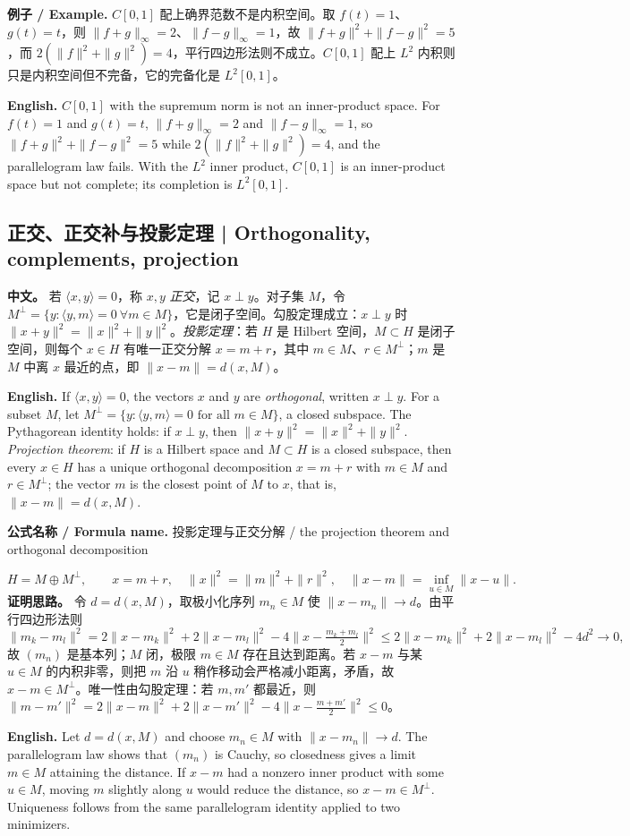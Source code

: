 \documentclass[UTF8,11pt,a4paper]{ctexart}
\newcommand{\EN}[1]{\par\noindent \textbf{English.} #1\par}
\newcommand{\FORMULA}[2]{\par\noindent\textbf{公式名称 / Formula name.} #1 / #2\par}
\newcommand{\EX}[2]{\par\noindent \textbf{例子 / Example.} #1\par\EN{#2}}
\newcommand{\APS}[2]{\par\noindent\textbf{中文。} #1\par\noindent\textbf{English.} #2\par\smallskip}
\begin{document}
\EX{$C[0,1]$ 配上确界范数不是内积空间。取 $f(t)=1$、$g(t)=t$，则 $\|f+g\|_\infty=2$、$\|f-g\|_\infty=1$，故 $\|f+g\|^2+\|f-g\|^2=5$，而 $2(\|f\|^2+\|g\|^2)=4$，平行四边形法则不成立。$C[0,1]$ 配上 $L^2$ 内积则只是内积空间但不完备，它的完备化是 $L^2[0,1]$。}{$C[0,1]$ with the supremum norm is not an inner-product space. For $f(t)=1$ and $g(t)=t$, $\|f+g\|_\infty=2$ and $\|f-g\|_\infty=1$, so $\|f+g\|^2+\|f-g\|^2=5$ while $2(\|f\|^2+\|g\|^2)=4$, and the parallelogram law fails. With the $L^2$ inner product, $C[0,1]$ is an inner-product space but not complete; its completion is $L^2[0,1]$.}

\subsection{正交、正交补与投影定理 | Orthogonality, complements, projection}
\APS{若 $\langle x,y\rangle=0$，称 $x,y$ \emph{正交}，记 $x\perp y$。对子集 $M$，令 $M^\perp=\{y:\langle y,m\rangle=0\ \forall m\in M\}$，它是闭子空间。勾股定理成立：$x\perp y$ 时 $\|x+y\|^2=\|x\|^2+\|y\|^2$。\emph{投影定理}：若 $H$ 是 Hilbert 空间，$M\subset H$ 是闭子空间，则每个 $x\in H$ 有唯一正交分解 $x=m+r$，其中 $m\in M$、$r\in M^\perp$；$m$ 是 $M$ 中离 $x$ 最近的点，即 $\|x-m\|=d(x,M)$。}{If $\langle x,y\rangle=0$, the vectors $x$ and $y$ are \emph{orthogonal}, written $x\perp y$. For a subset $M$, let $M^\perp=\{y:\langle y,m\rangle=0\text{ for all }m\in M\}$, a closed subspace. The Pythagorean identity holds: if $x\perp y$, then $\|x+y\|^2=\|x\|^2+\|y\|^2$. \emph{Projection theorem}: if $H$ is a Hilbert space and $M\subset H$ is a closed subspace, then every $x\in H$ has a unique orthogonal decomposition $x=m+r$ with $m\in M$ and $r\in M^\perp$; the vector $m$ is the closest point of $M$ to $x$, that is, $\|x-m\|=d(x,M)$.}
\FORMULA{投影定理与正交分解}{the projection theorem and orthogonal decomposition}
\[
H=M\oplus M^\perp,\qquad
x=m+r,\quad \|x\|^2=\|m\|^2+\|r\|^2,\quad
\|x-m\|=\inf_{u\in M}\|x-u\|.
\]
\noindent\textbf{证明思路。} 令 $d=d(x,M)$，取极小化序列 $m_n\in M$ 使 $\|x-m_n\|\to d$。由平行四边形法则
\[
\|m_k-m_l\|^2=2\|x-m_k\|^2+2\|x-m_l\|^2-4\|x-\tfrac{m_k+m_l}{2}\|^2
\le2\|x-m_k\|^2+2\|x-m_l\|^2-4d^2\to0,
\]
故 $(m_n)$ 是基本列；$M$ 闭，极限 $m\in M$ 存在且达到距离。若 $x-m$ 与某 $u\in M$ 的内积非零，则把 $m$ 沿 $u$ 稍作移动会严格减小距离，矛盾，故 $x-m\in M^\perp$。唯一性由勾股定理：若 $m,m'$ 都最近，则 $\|m-m'\|^2=2\|x-m\|^2+2\|x-m'\|^2-4\|x-\frac{m+m'}{2}\|^2\le0$。\EN{Let $d=d(x,M)$ and choose $m_n\in M$ with $\|x-m_n\|\to d$. The parallelogram law shows that $(m_n)$ is Cauchy, so closedness gives a limit $m\in M$ attaining the distance. If $x-m$ had a nonzero inner product with some $u\in M$, moving $m$ slightly along $u$ would reduce the distance, so $x-m\in M^\perp$. Uniqueness follows from the same parallelogram identity applied to two minimizers.}
\end{document}
